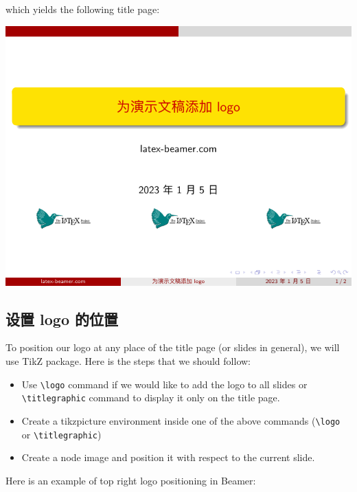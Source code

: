 \inputminted[linenos=true]{latex}{examples/beamer/beamerlogo03.tex}

which yields the following title page:

\includegraphics[page=1]{examples/beamer/beamerlogo03.pdf}

\subsection{设置 logo 的位置}

To position our logo at any place of the title page (or slides in general), we will use TikZ package. Here is the steps that we should follow:

\begin{itemize}
  \item Use \verb|\logo| command if we would like to add the logo to all slides or \verb|\titlegraphic| command to display it only on the title page.
  \item Create a tikzpicture environment inside one of the above commands (\verb|\logo| or \verb|\titlegraphic|)
  \item Create a node image and position it with respect to the current slide.
\end{itemize}
  
Here is an example of top right logo positioning in Beamer:

\inputminted[linenos=true]{latex}{examples/beamer/beamerlogo04.tex}

